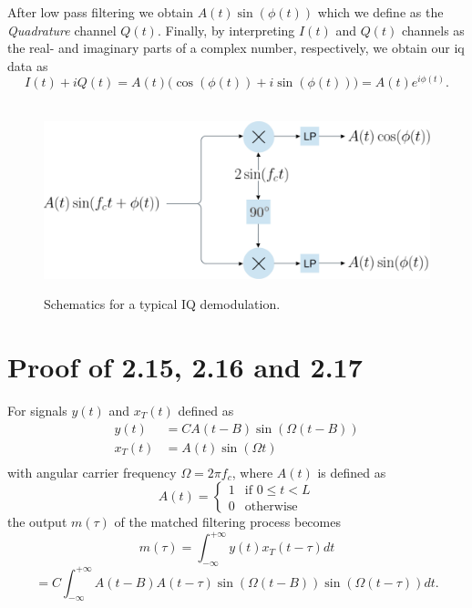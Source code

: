 \begin{appendices}
After low pass filtering we obtain $A(t)\sin(\phi(t))$ which we define as the \emph{Quadrature} channel $Q(t)$. Finally, by interpreting $I(t)$ and $Q(t)$ channels as the real- and imaginary parts of a complex number, respectively, we obtain our \gls{iq} data as
\begin{equation}
	I(t)+iQ(t)=A(t)\Big(\cos(\phi(t))+i\sin(\phi(t))\Big)=A(t)e^{i\phi(t)}.
\end{equation}

\begin{figure}
	\centering
	\hbox{\hspace{-0.5em} \includegraphics[scale=0.60]{figs_temp/iq_demod.jpg}}
	\caption{Schematics for a typical IQ demodulation.}
	\label{fig:iq_demod}
\end{figure}

\chapter{Proof of 2.15, 2.16 and 2.17}\label{apx:conv}

For signals $y(t)$ and $x_T(t)$ defined as
\begin{equation}
	\begin{split}
		y(t) &= CA(t - B)\sin(\Omega(t - B)) \\
		x_T(t) &= A(t)\sin(\Omega t) \\
	\end{split}
\end{equation}
with angular carrier frequency $\Omega = 2\pi f_c$, where $A(t)$ is defined as 
\begin{equation}
	A(t) = \begin{cases}
		1 & \text{if $0 \leq t < L$} \\
		0 & \text{otherwise}
	\end{cases}
\end{equation}
the output $m(\tau)$ of the matched filtering process becomes
\begin{equation}
	m(\tau) 
	= \int_{-\infty}^{+\infty}y(t)x_T(t-\tau)dt
\end{equation}
\begin{equation}	
	= C \int_{-\infty}^{+\infty}A(t-B)A(t-\tau)\sin(\Omega(t-B))\sin(\Omega(t-\tau))dt.
\end{equation}


\end{appendices}
